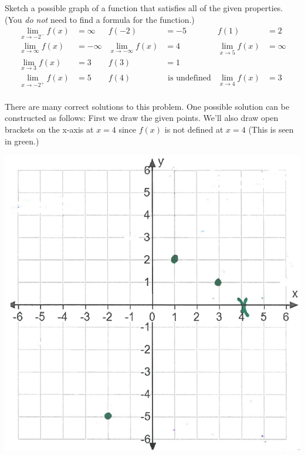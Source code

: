 \documentclass[nooutcomes]{ximera}
\begin{document}
\begin{problem}
 Sketch a possible graph of a function that satisfies all of the given properties.
  (You \emph{do not} need to find a formula for the function.)
  \begin{align*}
 	\lim_{x \to -2^-} f(x) &= \infty &   f(-2) &= -5 &  f(1) &= 2 \\
	 \lim_{x \to \infty} f(x) &= -\infty & \lim_{x \to -\infty} f(x) &= 4 & \lim_{x \to 5} f(x) &= \infty \\
	 \lim_{x \to 3} f(x) &= 3 & f(3) &=  1 &\\
	  \lim_{x \to -2^+}f(x)&=5  & f(4) &\text{ is undefined}& \lim_{x \to 4}f(x)&=3\\
  \end{align*}
  \begin{freeResponse}
      There are many correct solutions to this problem.
  One possible solution can be constructed as follows:
	First we draw the given points.  We'll also draw open brackets on the x-axis at $x=4$ since $f(x)$ is not defined at $x=4$ (This is seen in green.)
	\begin{image}
   	 \includegraphics[scale = 0.4]{Figure10.png}   
	\end{image} 


\end{freeResponse}
\end{problem}
\end{document}
